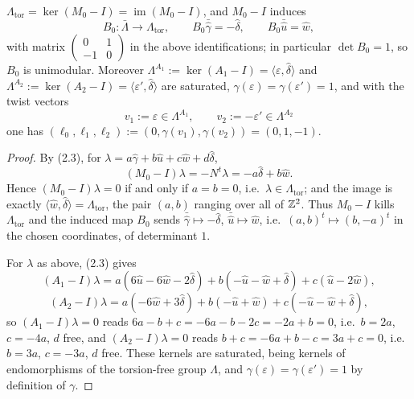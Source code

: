 \begin{lemma}\label{lem:B0}
$\Lambda_{\mathrm{tor}} = \ker(M_0-I) = \operatorname{im}(M_0-I)$, and $M_0-I$ induces
\[
B_0 \colon \bar\Lambda \to \Lambda_{\mathrm{tor}}, \qquad B_0\bar{\hat\gamma} = -\hat\delta, \qquad B_0\bar{\hat u} = \hat w,
\]
with matrix $\left(\begin{smallmatrix} 0 & 1 \\ -1 & 0\end{smallmatrix}\right)$ in the above identifications; in particular $\det B_0 = 1$, so $B_0$ is unimodular. Moreover $\Lambda^{A_1} := \ker(A_1-I) = \langle \varepsilon,\hat\delta\rangle$ and $\Lambda^{A_2} := \ker(A_2-I) = \langle \varepsilon',\hat\delta\rangle$ are saturated, $\gamma(\varepsilon) = \gamma(\varepsilon') = 1$, and with the twist vectors
\[
v_1 := \varepsilon \in \Lambda^{A_1}, \qquad v_2 := -\varepsilon' \in \Lambda^{A_2}
\]
one has $(\ell_0,\ell_1,\ell_2) := (0,\gamma(v_1),\gamma(v_2)) = (0,1,-1)$.
\end{lemma}

\begin{proof}
By (2.3), for $\lambda = a\hat\gamma+b\hat u+c\hat w+d\hat\delta$,
\[
(M_0-I)\lambda = -N^t\lambda = -a\hat\delta+b\hat w.
\]
Hence $(M_0-I)\lambda = 0$ if and only if $a=b=0$, i.e.\ $\lambda \in \Lambda_{\mathrm{tor}}$; and the image is exactly $\langle \hat w,\hat\delta\rangle = \Lambda_{\mathrm{tor}}$, the pair $(a,b)$ ranging over all of $\mathbb{Z}^2$. Thus $M_0-I$ kills $\Lambda_{\mathrm{tor}}$ and the induced map $B_0$ sends $\bar{\hat\gamma}\mapsto -\hat\delta$, $\bar{\hat u}\mapsto \hat w$, i.e.\ $(a,b)^t \mapsto (b,-a)^t$ in the chosen coordinates, of determinant $1$.

For $\lambda$ as above, (2.3) gives
\[
(A_1-I)\lambda = a(6\hat u-6\hat w-2\hat\delta)+b(-\hat u-\hat w+\hat\delta)+c(\hat u-2\hat w),
\]
\[
(A_2-I)\lambda = a(-6\hat w+3\hat\delta)+b(-\hat u+\hat w)+c(-\hat u-\hat w+\hat\delta),
\]
so $(A_1-I)\lambda = 0$ reads $6a-b+c = -6a-b-2c = -2a+b = 0$, i.e.\ $b=2a$, $c=-4a$, $d$ free, and $(A_2-I)\lambda = 0$ reads $b+c = -6a+b-c = 3a+c = 0$, i.e.\ $b=3a$, $c=-3a$, $d$ free. These kernels are saturated, being kernels of endomorphisms of the torsion-free group $\Lambda$, and $\gamma(\varepsilon) = \gamma(\varepsilon') = 1$ by definition of $\gamma$.
\end{proof}

